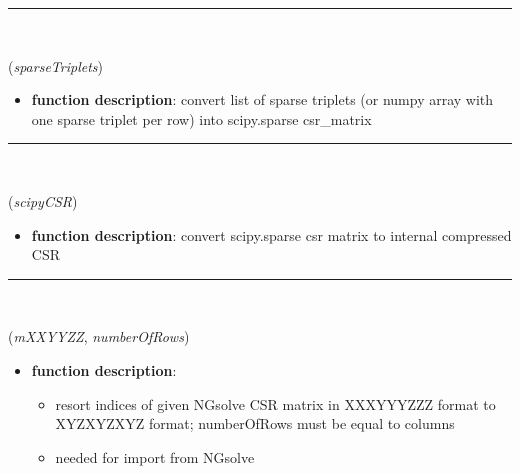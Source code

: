 \begin{itemize}[leftmargin=1.4cm]
\begin{itemize}[leftmargin=1.4cm]
\begin{itemize}[leftmargin=1.4cm]
\begin{itemize}[leftmargin=0.5cm]
\begin{itemize}[leftmargin=1.4cm]
\begin{itemize}[leftmargin=1.4cm]
\begin{itemize}[leftmargin=1.4cm]
\begin{itemize}[leftmargin=0.5cm]
%
\noindent\rule{8cm}{0.75pt}\vspace{1pt} \\ 
\begin{flushleft}
\label{sec:FEM:SparseTripletsToScipySparseCSR}
({\it sparseTriplets})
\end{flushleft}
\setlength{\itemindent}{0.7cm}
\begin{itemize}[leftmargin=0.7cm]
\item[--]
{\bf function description}: convert list of sparse triplets (or numpy array with one sparse triplet per row) into scipy.sparse csr_matrix
\vspace{12pt}\end{itemize}
%
\noindent\rule{8cm}{0.75pt}\vspace{1pt} \\ 
\begin{flushleft}
\label{sec:FEM:ScipySparseCSRtoCSR}
({\it scipyCSR})
\end{flushleft}
\setlength{\itemindent}{0.7cm}
\begin{itemize}[leftmargin=0.7cm]
\item[--]
{\bf function description}: convert scipy.sparse csr matrix to internal compressed CSR
\vspace{12pt}\end{itemize}
%
\noindent\rule{8cm}{0.75pt}\vspace{1pt} \\ 
\begin{flushleft}
\label{sec:FEM:ResortIndicesOfCSRmatrix}
({\it mXXYYZZ}, {\it numberOfRows})
\end{flushleft}
\setlength{\itemindent}{0.7cm}
\begin{itemize}[leftmargin=0.7cm]
\item[--]
{\bf function description}: \vspace{-6pt}
\begin{itemize}[leftmargin=1.2cm]
\setlength{\itemindent}{-0.7cm}
\item[]resort indices of given NGsolve CSR matrix in XXXYYYZZZ format to XYZXYZXYZ format; numberOfRows must be equal to columns
\item[]needed for import from NGsolve

\end{itemize}
\end{itemize}
\end{itemize}
\end{itemize}
\end{itemize}
\end{itemize}
\end{itemize}
\end{itemize}
\end{itemize}
\end{itemize}
